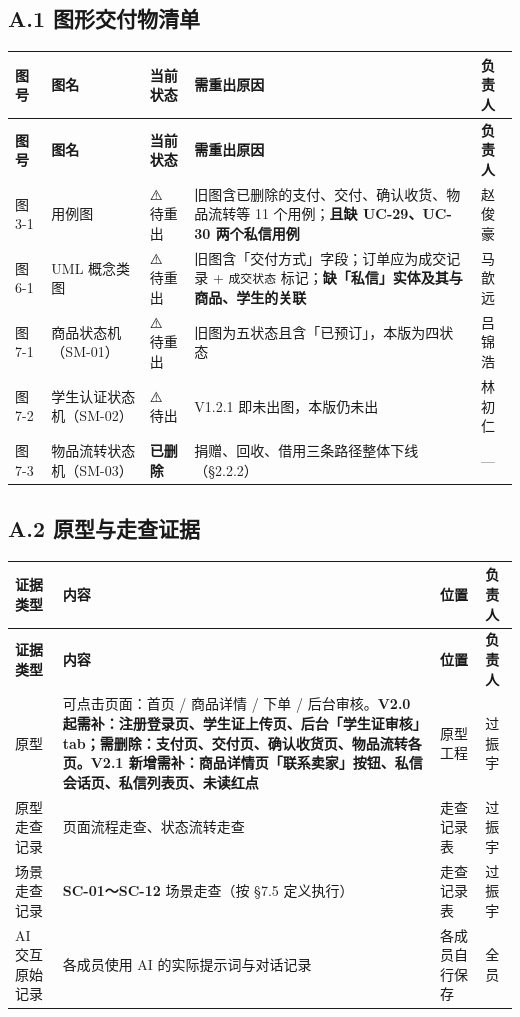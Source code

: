 \documentclass[12pt,a4paper]{ctexart}
\begin{document}
\subsection*{A.1 图形交付物清单}


{\footnotesize
\begin{longtable}{|p{1.49cm}|p{3.03cm}|p{1.66cm}|p{8.34cm}|p{1.49cm}|}
\hline
\textbf{图号} & \textbf{图名} & \textbf{当前状态} & \textbf{需重出原因} & \textbf{负责人} \\
\hline
\endfirsthead
\hline
\textbf{图号} & \textbf{图名} & \textbf{当前状态} & \textbf{需重出原因} & \textbf{负责人} \\
\hline
\endhead
\hline
\endfoot
图 3-1 & 用例图 & ⚠️ 待重出 & 旧图含已删除的支付、交付、确认收货、物品流转等 11 个用例；\textbf{且缺 UC-29、UC-30 两个私信用例} & 赵俊豪 \\
\hline
图 6-1 & UML 概念类图 & ⚠️ 待重出 & 旧图含「交付方式」字段；订单应为成交记录 + \texttt{成交状态} 标记；\textbf{缺「私信」实体及其与商品、学生的关联} & 马歆远 \\
\hline
图 7-1 & 商品状态机（SM-01） & ⚠️ 待重出 & 旧图为五状态且含「已预订」，本版为四状态 & 吕锦浩 \\
\hline
图 7-2 & 学生认证状态机（SM-02） & ⚠️ 待出 & V1.2.1 即未出图，本版仍未出 & 林初仁 \\
\hline
图 7-3 & 物品流转状态机（SM-03） & \textbf{已删除} & 捐赠、回收、借用三条路径整体下线（§2.2.2） & — \\
\hline
\end{longtable}
}



\subsection*{A.2 原型与走查证据}

{\footnotesize
\begin{longtable}{|p{1.58cm}|p{11.43cm}|p{1.50cm}|p{1.49cm}|}
\hline
\textbf{证据类型} & \textbf{内容} & \textbf{位置} & \textbf{负责人} \\
\hline
\endfirsthead
\hline
\textbf{证据类型} & \textbf{内容} & \textbf{位置} & \textbf{负责人} \\
\hline
\endhead
\hline
\endfoot
原型 & 可点击页面：首页 / 商品详情 / 下单 / 后台审核。\textbf{V2.0 起需补：注册登录页、学生证上传页、后台「学生证审核」tab；需删除：支付页、交付页、确认收货页、物品流转各页。V2.1 新增需补：商品详情页「联系卖家」按钮、私信会话页、私信列表页、未读红点} & 原型工程 & 过振宇 \\
\hline
原型走查记录 & 页面流程走查、状态流转走查 & 走查记录表 & 过振宇 \\
\hline
场景走查记录 & \textbf{SC-01～SC-12} 场景走查（按 §7.5 定义执行） & 走查记录表 & 过振宇 \\
\hline
AI 交互原始记录 & 各成员使用 AI 的实际提示词与对话记录 & 各成员自行保存 & 全员 \\
\hline
\end{longtable}
}
\end{document}
